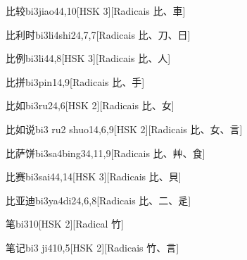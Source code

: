 \begin{entry}{比较}{bi3jiao4}{4,10}[HSK 3][Radicais ⽐、⾞]
\end{entry}

\begin{entry}{比利时}{bi3li4shi2}{4,7,7}[Radicais ⽐、⼑、⽇]
\end{entry}

\begin{entry}{比例}{bi3li4}{4,8}[HSK 3][Radicais ⽐、⼈]
\end{entry}

\begin{entry}{比拼}{bi3pin1}{4,9}[Radicais ⽐、⼿]
\end{entry}

\begin{entry}{比如}{bi3ru2}{4,6}[HSK 2][Radicais ⽐、⼥]
\end{entry}

\begin{entry}{比如说}{bi3 ru2 shuo1}{4,6,9}[HSK 2][Radicais ⽐、⼥、⾔]
\end{entry}

\begin{entry}{比萨饼}{bi3sa4bing3}{4,11,9}[Radicais ⽐、⾋、⾷]
\end{entry}

\begin{entry}{比赛}{bi3sai4}{4,14}[HSK 3][Radicais ⽐、⾙]
\end{entry}

\begin{entry}{比亚迪}{bi3ya4di2}{4,6,8}[Radicais ⽐、⼆、⾡]
\end{entry}

\begin{entry}{笔}{bi3}{10}[HSK 2][Radical ⽵]
\end{entry}

\begin{entry}{笔记}{bi3 ji4}{10,5}[HSK 2][Radicais ⽵、⾔]
\end{entry}

